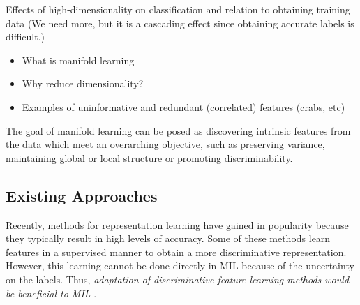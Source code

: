 Effects of high-dimensionality on classification and relation to obtaining training data (We need more, but it is a cascading effect since obtaining accurate labels is difficult.)

\begin{itemize}
	\item What is manifold learning
	\item Why reduce dimensionality?
	\item Examples of uninformative and redundant (correlated) features (crabs, etc)
\end{itemize}


The goal of manifold learning can be posed as discovering intrinsic features from the data which meet an overarching objective, such as preserving variance, maintaining global or local structure  or promoting discriminability.

\subsection{Existing Approaches}
Recently, methods for representation learning have gained in popularity because they typically result in high levels of accuracy.  Some of these methods  learn features in a supervised manner to obtain a more discriminative representation.  However, this learning cannot be done directly in  MIL because of the uncertainty on the labels.  Thus, \textit{adaptation of discriminative  feature learning methods would be beneficial to MIL} \cite{Carbonneau2016MILSurvey}.

